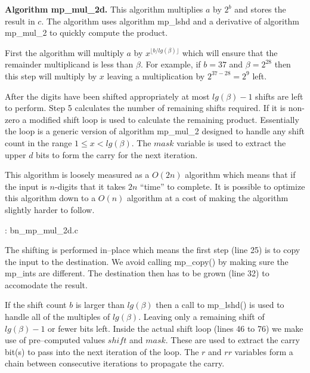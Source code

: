 \documentclass[b5paper]{book}
\begin{document}
\textbf{Algorithm mp\_mul\_2d.}
This algorithm multiplies $a$ by $2^b$ and stores the result in $c$.  The algorithm uses algorithm mp\_lshd and a derivative of algorithm mp\_mul\_2 to
quickly compute the product.

First the algorithm will multiply $a$ by $x^{\lfloor b / lg(\beta) \rfloor}$ which will ensure that the remainder multiplicand is less than 
$\beta$.  For example, if $b = 37$ and $\beta = 2^{28}$ then this step will multiply by $x$ leaving a multiplication by $2^{37 - 28} = 2^{9}$ 
left.

After the digits have been shifted appropriately at most $lg(\beta) - 1$ shifts are left to perform.  Step 5 calculates the number of remaining shifts 
required.  If it is non-zero a modified shift loop is used to calculate the remaining product.  
Essentially the loop is a generic version of algorithm mp\_mul\_2 designed to handle any shift count in the range $1 \le x < lg(\beta)$.  The $mask$
variable is used to extract the upper $d$ bits to form the carry for the next iteration.  

This algorithm is loosely measured as a $O(2n)$ algorithm which means that if the input is $n$-digits that it takes $2n$ ``time'' to 
complete.  It is possible to optimize this algorithm down to a $O(n)$ algorithm at a cost of making the algorithm slightly harder to follow.

\vspace{+3mm}\begin{small}
\hspace{-5.1mm}{\bf File}: bn\_mp\_mul\_2d.c
\vspace{-3mm}
\begin{alltt}
\end{alltt}
\end{small}

The shifting is performed in--place which means the first step (line 25) is to copy the input to the 
destination.  We avoid calling mp\_copy() by making sure the mp\_ints are different.  The destination then
has to be grown (line 32) to accomodate the result.

If the shift count $b$ is larger than $lg(\beta)$ then a call to mp\_lshd() is used to handle all of the multiples 
of $lg(\beta)$.  Leaving only a remaining shift of $lg(\beta) - 1$ or fewer bits left.  Inside the actual shift 
loop (lines 46 to 76) we make use of pre--computed values $shift$ and $mask$.   These are used to
extract the carry bit(s) to pass into the next iteration of the loop.  The $r$ and $rr$ variables form a 
chain between consecutive iterations to propagate the carry.  
\end{document}
